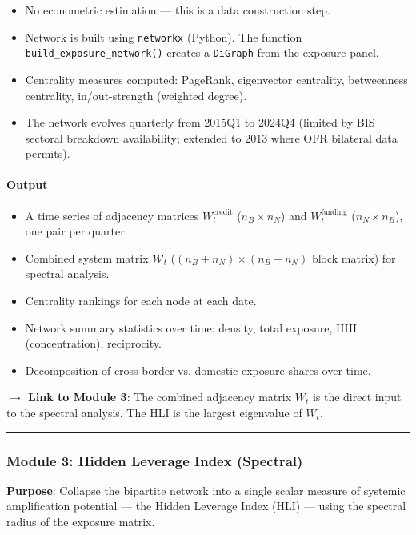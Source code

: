 \documentclass[11pt,a4paper]{article}
\begin{document}
\begin{itemize}
\item No econometric estimation --- this is a data construction step.
\item Network is built using \texttt{networkx} (Python). The function \texttt{build\_exposure\_network()} creates a \texttt{DiGraph} from the exposure panel.
\item Centrality measures computed: PageRank, eigenvector centrality, betweenness centrality, in/out-strength (weighted degree).
\item The network evolves quarterly from 2015Q1 to 2024Q4 (limited by BIS sectoral breakdown availability; extended to 2013 where OFR bilateral data permits).

\end{itemize}

\paragraph{Output}

\begin{itemize}
\item A time series of adjacency matrices $W_t^{\text{credit}}$ ($n_B \times n_N$) and $W_t^{\text{funding}}$ ($n_N \times n_B$), one pair per quarter.
\item Combined system matrix $\mathcal{W}_t$ ($(n_B + n_N) \times (n_B + n_N)$ block matrix) for spectral analysis.
\item Centrality rankings for each node at each date.
\item Network summary statistics over time: density, total exposure, HHI (concentration), reciprocity.
\item Decomposition of cross-border vs. domestic exposure shares over time.

\end{itemize}
\textbf{$\rightarrow$ Link to Module 3}: The combined adjacency matrix $W_t$ is the direct input to the spectral analysis. The HLI is the largest eigenvalue of $W_t$.


\bigskip\noindent\rule{\textwidth}{0.4pt}\bigskip


\subsubsection{Module 3: Hidden Leverage Index (Spectral)}

\textbf{Purpose}: Collapse the bipartite network into a single scalar measure of systemic amplification potential --- the Hidden Leverage Index (HLI) --- using the spectral radius of the exposure matrix.
\end{document}
